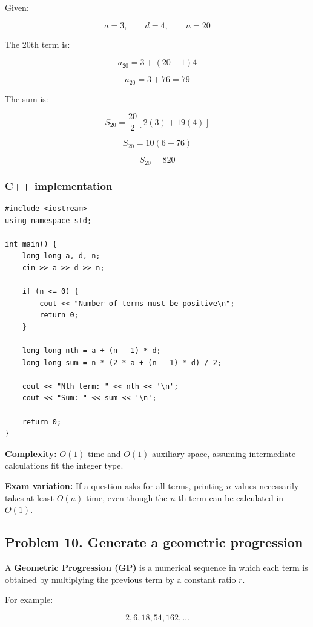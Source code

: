 Given:


\[
a=3,\qquad d=4,\qquad n=20
\]


The 20th term is:


\[
a_{20}=3+(20-1)4
\]



\[
a_{20}=3+76=\boxed{79}
\]


The sum is:


\[
S_{20}=\frac{20}{2}[2(3)+19(4)]
\]



\[
S_{20}=10(6+76)
\]



\[
\boxed{S_{20}=820}
\]


\subsubsection{C++ implementation}

\begin{lstlisting}[style=cppstyle]
#include <iostream>
using namespace std;

int main() {
    long long a, d, n;
    cin >> a >> d >> n;

    if (n <= 0) {
        cout << "Number of terms must be positive\n";
        return 0;
    }

    long long nth = a + (n - 1) * d;
    long long sum = n * (2 * a + (n - 1) * d) / 2;

    cout << "Nth term: " << nth << '\n';
    cout << "Sum: " << sum << '\n';

    return 0;
}
\end{lstlisting}

\textbf{Complexity:} $O(1)$ time and $O(1)$ auxiliary space, assuming intermediate calculations fit the integer type.

\textbf{Exam variation:} If a question asks for all terms, printing $n$ values necessarily takes at least $O(n)$ time, even though the $n$-th term can be calculated in $O(1)$.

\subsection{Problem 10. Generate a geometric progression}

A \textbf{Geometric Progression (GP)} is a numerical sequence in which each term is obtained by multiplying the previous term by a constant ratio $r$.

For example:


\[
2,6,18,54,162,\ldots
\]


